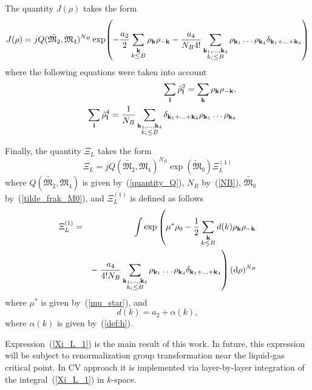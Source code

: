 The quantity $J(\rho)$ takes the form
\begin{equation}
	J(\rho) = j Q(\tilde{\mathfrak{M}_2}, \mathfrak{M}_4)^{N_B}
	\exp(-\frac{a_2}{2}\sum_{\substack{\vb k \\ k \leq B}} \rho_{\vb k}\rho_{-{\vb k}} 
	- \frac{a_4}{N_B 4!} \sum_{\substack{\vb k_1, \dotsc, \vb k_4 \\ k_i \leq B}} \rho_{\vb k_1} \dotsc \rho_{\vb k_4} \delta_{\vb{k}_1 + \dotsc + \vb{k}_4} )
\end{equation}
where the following equations were taken into account
\begin{eqnarray}
	&&\sum_{\vb l}\tilde{\rho}_{\vb l}^2 = \sum_{\vb k}\rho_{\vb k} \rho_{-\vb k},
	\\
	&&\sum_{\vb l}\tilde{\rho}_{\vb l}^4 = \frac{1}{N_B}\sum\limits_{\substack{\vb{k}_1,\dotsc,\vb{k}_4 \\ {k_i \le B}}}
	\delta_{\vb{k}_1 + \dotsc + \vb{k}_4} 
	\rho_{{\vb k}_1} \dots \rho_{{\vb k}_4}
\end{eqnarray}

Finally, the quantity $\Xi_L$ takes the form
\begin{equation}
	\label{Xi_L}
	\Xi_L = jQ(\tilde{\mathfrak{M}_2}, \mathfrak{M}_4)^{N_B} \exp(\tilde{\mathfrak{M}}_0) \Xi_L^{(1)}
\end{equation}
where $Q(\tilde{\mathfrak{M}_2}, \mathfrak{M}_4)$ is given by~(\ref{quantity_Q}), $N_B$ by~(\ref{NB}), $\tilde{\mathfrak{M}_0}$ by~(\ref{tilde_frak_M0}), and $\Xi_L^{(1)}$ is defined as follows
\begin{eqnarray}
	\label{Xi_L_1}
	\Xi_L^{(1)} &=& 
	\int \exp\left(
	\mu^* \rho_0 - \frac{1}{2} \sum_{\substack{\vb k \\ k \leq B}} d(k) \rho_{\vb k} \rho_{-\vb k} 
	\right.\\
	 && -\left. \frac{a_4}{4! N_B} \sum_{\substack{\vb k_1, \dotsc, \vb k_4 \\ k_i \leq B}} \rho_{\vb k_1} \dotsc \rho_{\vb k_4} \delta_{\vb{k}_1 + \dotsc + \vb{k}_4} \right) ({\rm d} \rho)^{N_B}
	 \nonumber
\end{eqnarray}
where $\mu^*$ is given by~(\ref{mu_star}), and 
\begin{equation}
	d(k) = a_2 + \alpha(k),
\end{equation}
where $\alpha(k)$ is given by~(\ref{def:h}).

Expression~(\ref{Xi_L_1}) is the main result of this work. In future, this expression will be subject to renormalization group transformation near the liquid-gas critical point. In CV approach it is implemented via layer-by-layer integration of the integral~(\ref{Xi_L_1}) in $k$-space.

